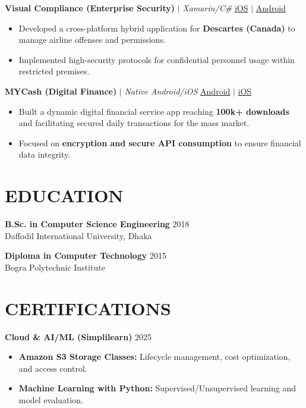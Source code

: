 \documentclass[10pt,a4paper]{article}
\begin{document}
\vspace{4pt}

\textbf{Visual Compliance (Enterprise Security)} $|$ \textit{Xamarin/C\#} \hfill \href{https://apps.apple.com/us/app/descartes-visual-compliance/id1573783267}{iOS} $|$ \href{https://play.google.com/store/apps/details?id=com.descartes.VisualCompliance}{Android}
\begin{itemize}
    \item Developed a cross-platform hybrid application for \textbf{Descartes (Canada)} to manage airline offenses and permissions.
    \item Implemented high-security protocols for confidential personnel usage within restricted premises.
\end{itemize}

\vspace{4pt}

\textbf{MYCash (Digital Finance)} $|$ \textit{Native Android/iOS} \hfill \href{https://play.google.com/store/apps/details?id=com.mycash}{Android} $|$ \href{https://apps.apple.com/us/app/mycash/id1658736258}{iOS}
\begin{itemize}
    \item Built a dynamic digital financial service app reaching \textbf{100k+ downloads} and facilitating secured daily transactions for the mass market.
    \item Focused on \textbf{encryption and secure API consumption} to ensure financial data integrity.
\end{itemize}

\section*{EDUCATION}

\textbf{B.Sc. in Computer Science Engineering} \hfill 2018 \\
Daffodil International University, Dhaka

\vspace{2pt}

\textbf{Diploma in Computer Technology} \hfill 2015 \\
Bogra Polytechnic Institute

\section*{CERTIFICATIONS}
\textbf{Cloud \& AI/ML (Simplilearn)} \hfill 2025
\begin{itemize}
    \item \textbf{Amazon S3 Storage Classes:} Lifecycle management, cost optimization, and access control.
    \item \textbf{Machine Learning with Python:} Supervised/Unsupervised learning and model evaluation.
\end{itemize}
\end{document}
